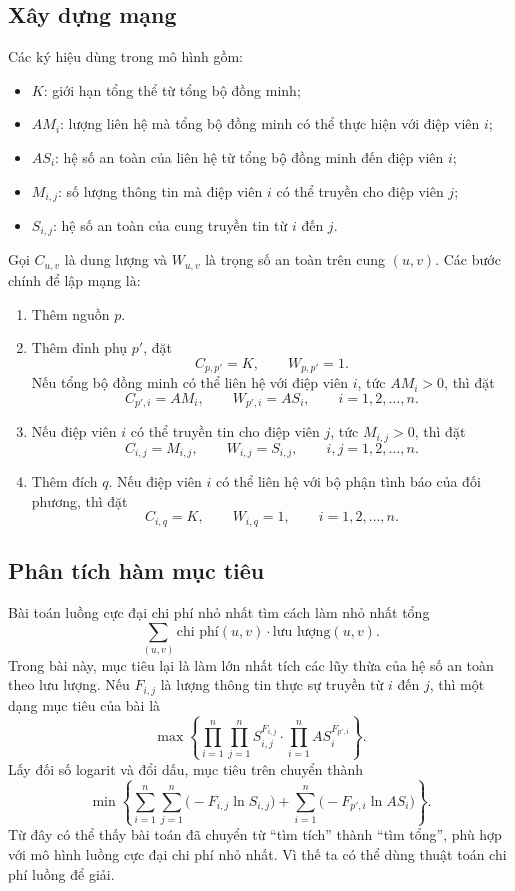 \documentclass[11pt]{article}
\begin{document}
\subsection{Xây dựng mạng}

Các ký hiệu dùng trong mô hình gồm:
\begin{itemize}
  \item \(K\): giới hạn tổng thể từ tổng bộ đồng minh;
  \item \(AM_i\): lượng liên hệ mà tổng bộ đồng minh có thể thực hiện với
  điệp viên \(i\);
  \item \(AS_i\): hệ số an toàn của liên hệ từ tổng bộ đồng minh đến điệp
  viên \(i\);
  \item \(M_{i,j}\): số lượng thông tin mà điệp viên \(i\) có thể truyền cho
  điệp viên \(j\);
  \item \(S_{i,j}\): hệ số an toàn của cung truyền tin từ \(i\) đến \(j\).
\end{itemize}

Gọi \(C_{u,v}\) là dung lượng và \(W_{u,v}\) là trọng số an toàn trên cung
\((u,v)\). Các bước chính để lập mạng là:

\begin{enumerate}
  \item Thêm nguồn \(p\).
  \item Thêm đỉnh phụ \(p'\), đặt
  \[
    C_{p,p'}=K,\qquad W_{p,p'}=1.
  \]
  Nếu tổng bộ đồng minh có thể liên hệ với điệp viên \(i\), tức \(AM_i>0\),
  thì đặt
  \[
    C_{p',i}=AM_i,\qquad W_{p',i}=AS_i,
    \qquad i=1,2,\ldots,n.
  \]
  \item Nếu điệp viên \(i\) có thể truyền tin cho điệp viên \(j\), tức
  \(M_{i,j}>0\), thì đặt
  \[
    C_{i,j}=M_{i,j},\qquad W_{i,j}=S_{i,j},
    \qquad i,j=1,2,\ldots,n.
  \]
  \item Thêm đích \(q\). Nếu điệp viên \(i\) có thể liên hệ với bộ phận tình
  báo của đối phương, thì đặt
  \[
    C_{i,q}=K,\qquad W_{i,q}=1,
    \qquad i=1,2,\ldots,n.
  \]
\end{enumerate}

\subsection{Phân tích hàm mục tiêu}

Bài toán luồng cực đại chi phí nhỏ nhất tìm cách làm nhỏ nhất tổng
\[
  \sum_{(u,v)} \text{chi phí}(u,v)\cdot \text{lưu lượng}(u,v).
\]
Trong bài này, mục tiêu lại là làm lớn nhất tích các lũy thừa của hệ số an
toàn theo lưu lượng. Nếu \(F_{i,j}\) là lượng thông tin thực sự truyền từ
\(i\) đến \(j\), thì một dạng mục tiêu của bài là
\[
  \max\left\{
    \prod_{i=1}^{n}\prod_{j=1}^{n} S_{i,j}^{F_{i,j}}
    \cdot
    \prod_{i=1}^{n} AS_i^{F_{p',i}}
  \right\}.
\]
Lấy đối số logarit và đổi dấu, mục tiêu trên chuyển thành
\[
  \min\left\{
    \sum_{i=1}^{n}\sum_{j=1}^{n}
      \bigl(-F_{i,j}\ln S_{i,j}\bigr)
    +
    \sum_{i=1}^{n}
      \bigl(-F_{p',i}\ln AS_i\bigr)
  \right\}.
\]
Từ đây có thể thấy bài toán đã chuyển từ ``tìm tích'' thành ``tìm tổng'', phù
hợp với mô hình luồng cực đại chi phí nhỏ nhất. Vì thế ta có thể dùng thuật
toán chi phí luồng để giải.
\end{document}
